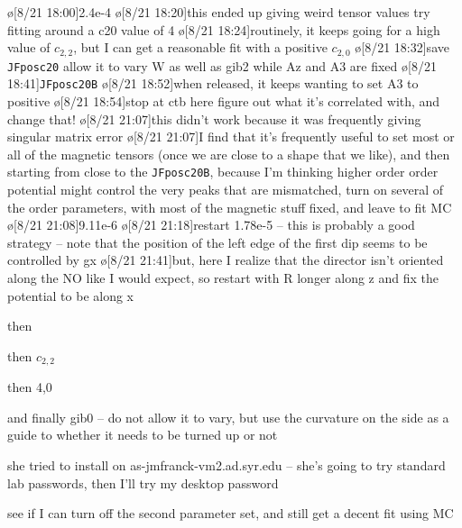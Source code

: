 \o[8/21 18:00]{2.4e-4}
\o[8/21 18:20]{this ended up giving weird tensor values}
try fitting around a c20 value of 4
\o[8/21 18:24]{routinely, it keeps going for a high value of $c_{2,2}$, but I can get a reasonable fit with a positive $c_{2,0}$}
\o[8/21 18:32]{save \texttt{JFposc20}}
allow it to vary W as well as gib2 while Az and A3 are fixed
\o[8/21 18:41]{\texttt{JFposc20B}}
\o[8/21 18:52]{when released, it keeps wanting to set A3 to positive}
\o[8/21 18:54]{stop at ctb here}
figure out what it's correlated with, and change that!
\o[8/21 21:07]{this didn't work because it was frequently giving singular matrix error}
\o[8/21 21:07]{I find that it's frequently useful to set most or all of the magnetic tensors (once we are close to a shape that we like), and then }
starting from close to the \texttt{JFposc20B}, because I'm thinking higher order order potential might control the very peaks that are mismatched, turn on several of the order parameters, with most of the magnetic stuff fixed, and leave to fit MC
\o[8/21 21:08]{9.11e-6}
\o[8/21 21:18]{restart 1.78e-5 -- this is probably a good strategy -- note that the position of the left edge of the first dip seems to be controlled by gx}
\o[8/21 21:41]{but, here I realize that the director isn't oriented along the NO like I would expect, so restart with R longer along z and fix the potential to be along x}



then 

then $c_{2,2}$

then 4,0

and finally gib0 -- do not allow it to vary, but use the curvature on the side as a guide to whether it needs to be turned up or not

she tried to install on as-jmfranck-vm2.ad.syr.edu
-- she's going to try standard lab passwords, then I'll try my desktop password

see if I can turn off the second parameter set, and still get a decent fit using MC

